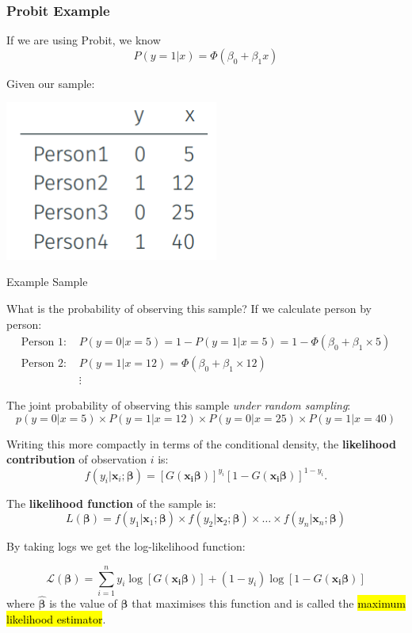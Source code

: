 \documentclass[11pt]{article}
\begin{document}
\subsubsection{Probit Example}

If we are using Probit, we know
\[P(y=1|x) = \Phi(\beta_0 + \beta_1 x)\]

Given our sample:
\begin{table}[h]
    \centering
    \includegraphics[width=7cm]{photos/probit example sample.png}
    \caption{Example Sample}
    \label{tab: probit example sample}
\end{table}

What is the probability of observing this sample? If we calculate person by person:
\begin{align*}
    \text{Person 1: } & P(y=0|x=5) = 1-P(y=1|x=5) = 1-\Phi(\beta_0 + \beta_1 \times5) \\
    \text{Person 2: } & P(y=1|x=12) = \Phi(\beta_0 + \beta_1 \times12) \\
    &\vdots
\end{align*}

The joint probability of observing this sample \textit{under random sampling}:
\[p(y=0|x=5) \times P(y=1|x=12) \times P(y=0|x=25) \times P(y=1|x=40)\]

Writing this more compactly in terms of the conditional density, the \textbf{likelihood contribution} of observation $i$ is:
\[f(y_i|\boldsymbol{x}_i;\boldsymbol{\beta}) = [G(\boldsymbol{x_i\beta})]^{y_i}[1-G(\boldsymbol{x_i\beta})]^{1-y_i}.\]

The \textbf{likelihood function} of the sample is:
\[L(\boldsymbol{\beta}) = f(y_1|\boldsymbol{x}_1;\boldsymbol{\beta}) \times f(y_2|\boldsymbol{x}_2;\boldsymbol{\beta}) \times \ldots \times f(y_n|\boldsymbol{x}_n;\boldsymbol{\beta})\]

By taking logs we get the log-likelihood function:

\begin{equation}
    \label{log likelihood function - probit example}
    \mathcal{L}(\boldsymbol{\beta}) = \sum_{i=1}^n y_i \log [G(\boldsymbol{x_i\beta})] + (1-y_i)\log [1-G(\boldsymbol{x_i\beta})]
\end{equation}
where $\hat{\boldsymbol{\beta}}$ is the value of $\boldsymbol{\beta}$ that maximises this function and is called the \hl{maximum likelihood estimator}.
\end{document}
